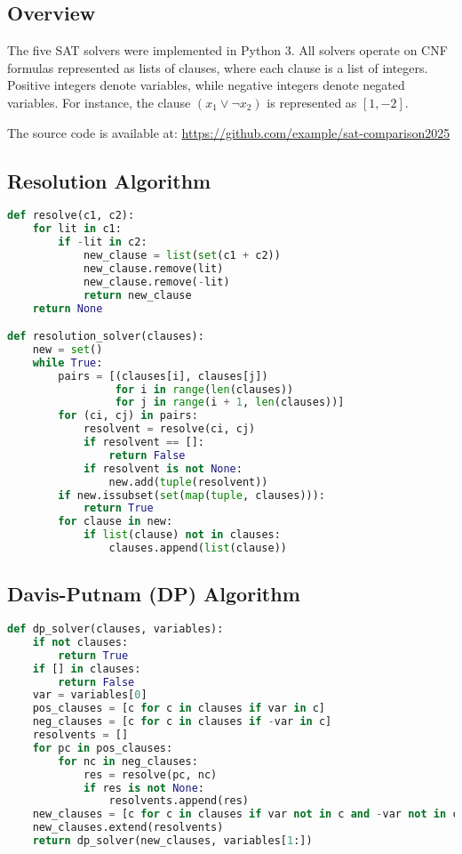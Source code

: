 \documentclass[11pt]{article}
\begin{document}
\subsection*{Overview}

The five SAT solvers were implemented in Python 3. All solvers operate on CNF formulas represented as lists of clauses, where each clause is a list of integers. Positive integers denote variables, while negative integers denote negated variables. For instance, the clause $(x_1 \lor \neg x_2)$ is represented as $[1, -2]$.

The source code is available at: \url{https://github.com/example/sat-comparison2025}

\subsection*{Resolution Algorithm}

\begin{lstlisting}[language=Python, caption=Resolution Algorithm]
def resolve(c1, c2):
    for lit in c1:
        if -lit in c2:
            new_clause = list(set(c1 + c2))
            new_clause.remove(lit)
            new_clause.remove(-lit)
            return new_clause
    return None

def resolution_solver(clauses):
    new = set()
    while True:
        pairs = [(clauses[i], clauses[j])
                 for i in range(len(clauses))
                 for j in range(i + 1, len(clauses))]
        for (ci, cj) in pairs:
            resolvent = resolve(ci, cj)
            if resolvent == []:
                return False
            if resolvent is not None:
                new.add(tuple(resolvent))
        if new.issubset(set(map(tuple, clauses))):
            return True
        for clause in new:
            if list(clause) not in clauses:
                clauses.append(list(clause))
\end{lstlisting}

\subsection*{Davis-Putnam (DP) Algorithm}

\begin{lstlisting}[language=Python, caption=Davis-Putnam Algorithm]
def dp_solver(clauses, variables):
    if not clauses:
        return True
    if [] in clauses:
        return False
    var = variables[0]
    pos_clauses = [c for c in clauses if var in c]
    neg_clauses = [c for c in clauses if -var in c]
    resolvents = []
    for pc in pos_clauses:
        for nc in neg_clauses:
            res = resolve(pc, nc)
            if res is not None:
                resolvents.append(res)
    new_clauses = [c for c in clauses if var not in c and -var not in c]
    new_clauses.extend(resolvents)
    return dp_solver(new_clauses, variables[1:])
\end{lstlisting}
\end{document}
